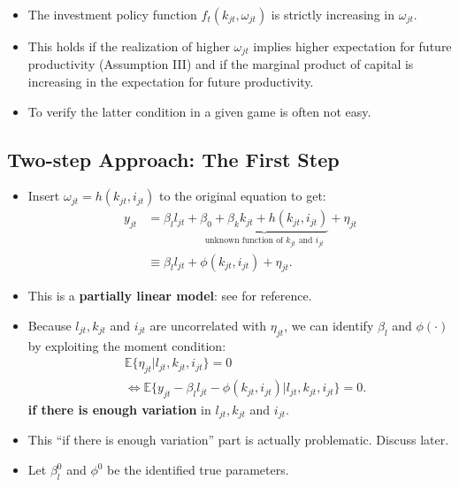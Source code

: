\documentclass[
]{book}
\providecommand{\tightlist}{%
  \setlength{\itemsep}{0pt}\setlength{\parskip}{0pt}}
\begin{document}
\begin{itemize}
\tightlist
\item
  The investment policy function \(f_t(k_{jt}, \omega_{jt})\) is strictly increasing in \(\omega_{jt}\).
\item
  This holds if the realization of higher \(\omega_{jt}\) implies higher expectation for future productivity (Assumption III) and if the marginal product of capital is increasing in the expectation for future productivity.
\item
  To verify the latter condition in a given game is often not easy.
\end{itemize}

\hypertarget{two-step-approach-the-first-step}{%
\subsection{Two-step Approach: The First Step}\label{two-step-approach-the-first-step}}

\begin{itemize}
\tightlist
\item
  Insert \(\omega_{jt} = h(k_{jt}, i_{jt})\) to the original equation to get:
  \begin{equation}
  \begin{split}
  y_{jt} &= \beta_l l_{jt} + \underbrace{\beta_0 + \beta_k k_{jt} + h(k_{jt}, i_{jt})}_{\text{unknown function of $k_{jt}$ and $i_{jt}$}} + \eta_{jt}\\
  & \equiv \beta_l l_{jt} + \phi(k_{jt}, i_{jt}) + \eta_{jt}.
  \end{split}
  \end{equation}
\item
  This is a \textbf{partially linear model}: see \citet{Ichimura2007} for reference.
\item
  Because \(l_{jt}, k_{jt}\) and \(i_{jt}\) are uncorrelated with \(\eta_{jt}\), we can identify \(\beta_l\) and \(\phi(\cdot)\) by exploiting the moment condition:
  \begin{equation}
  \begin{split}
  & \mathbb{E}\{\eta_{jt}|l_{jt}, k_{jt}, i_{jt}\} = 0\\
  & \Leftrightarrow \mathbb{E}\{y_{jt} - \beta_l l_{jt} - \phi(k_{jt}, i_{jt}) |l_{jt}, k_{jt}, i_{jt}\} = 0.
  \end{split}
  \end{equation}
  \textbf{if there is enough variation} in \(l_{jt}, k_{jt}\) and \(i_{jt}\).
\item
  This ``if there is enough variation'' part is actually problematic. Discuss later.
\item
  Let \(\beta_l^0\) and \(\phi^0\) be the identified true parameters.
\end{itemize}
\end{document}
